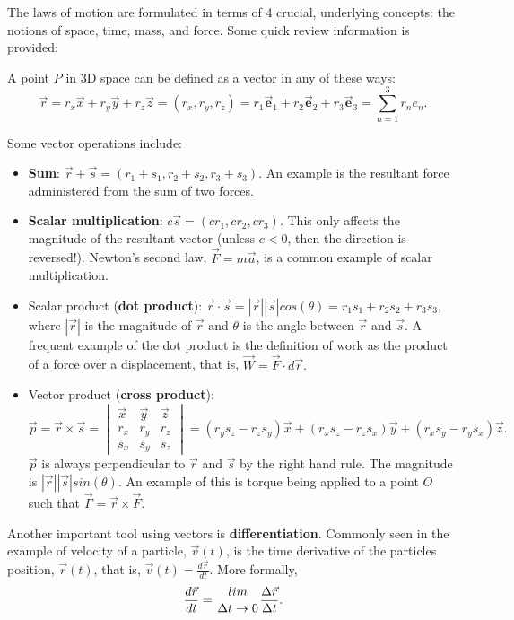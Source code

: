 The laws of motion are formulated in terms of 4 crucial, underlying concepts: the notions of space, time, mass, and force. Some quick review information is provided:

A point $P$ in 3D space can be defined as a vector in any of these ways:
\begin{equation*}
    \vec{r} = r_x \vec{x} + r_y \vec{y} + r_z \vec{z} = (r_x, r_y, r_z) = r_1 {\bm \vec{e}_1} + r_2 {\bm \vec{e}_2} + r_3 {\bm \vec{e}_3} = \sum_{n=1}^{3} r_n e_n.
\end{equation*}

Some vector operations include:
\begin{itemize}
    \item {\bfseries Sum}: $ \vec{r} + \vec{s} = (r_1 + s_1, r_2 + s_2, r_3 + s_3). $ An example is the resultant force administered from the sum of two forces.
    
    \item {\bfseries Scalar multiplication}: $ c\vec{s} = (cr_1, cr_2, cr_3). $ This only affects the magnitude of the resultant vector (unless $c < 0$, then the direction is reversed!). Newton's second law, $\vec{F} = m\vec{a}$, is a common example of scalar multiplication.
    
    \item Scalar product ({\bfseries dot product}): $\vec{r}\cdot\vec{s} = |\vec{r}||\vec{s}|cos(\theta) = r_1 s_1 + r_2 s_2 + r_3 s_3, $ where $|\vec{r}|$ is the magnitude of $\vec{r}$ and $\theta$ is the angle between $\vec{r}$ and $\vec{s}$. A frequent example of the dot product is the definition of work as the product of a force over a displacement, that is, $\vec{W} = \vec{F} \cdot d\vec{r}.$
    
    \item Vector product ({\bfseries cross product}): $ \vec{p} = \vec{r} \times \vec{s} = \begin{vmatrix} \vec{x} & \vec{y} & \vec{z} \\ r_x & r_y & r_z \\ s_x & s_y & s_z \end{vmatrix} = (r_y s_z - r_z s_y)\vec{x} + (r_x s_z - r_z s_x)\vec{y} + (r_x s_y - r_y s_x)\vec{z}. $ $\vec{p}$ is always perpendicular to $\vec{r}$ and $\vec{s}$ by the right hand rule. The magnitude is $|\vec{r}||\vec{s}|sin(\theta)$. An example of this is torque being applied to a point $O$ such that $\vec{\Gamma} = \vec{r} \times \vec{F}.$
\end{itemize}

Another important tool using vectors is {\bfseries differentiation}. Commonly seen in the example of velocity of a particle, $\vec{v}(t)$, is the time derivative of the particles position, $\vec{r}(t)$, that is, $\vec{v}(t) = \frac{d\vec{r}}{dt}$. More formally,
\begin{equation*}
    \frac{d\vec{r}}{dt} = \bfrac{lim}{\Delta t \rightarrow 0} \frac{\Delta \vec{r}}{\Delta t}.
\end{equation*}

